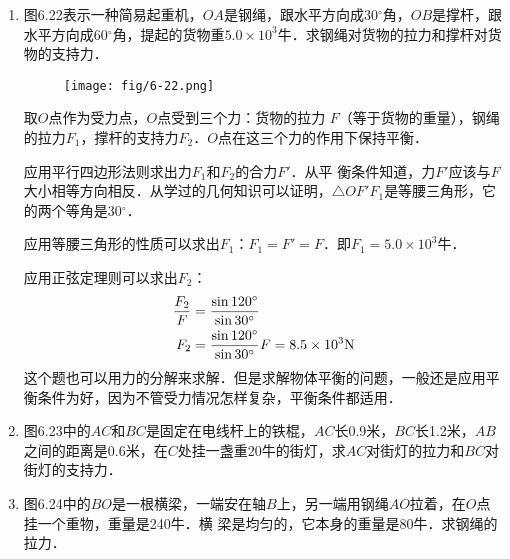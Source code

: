 \begin{enumerate}
    \item 图6.22表示一种简易起重机，$OA$是钢绳，跟水平方向成30$^\circ$角，$OB$是撑杆，跟水平方向成60$^\circ$角，提起的货物重$5.0\times 10^3$牛．求钢绳对货物的拉力和撑杆对货物的支持力．
\begin{figure}[htp]
\centering\texttt{[image: fig/6-22.png]}
\caption{}
\end{figure}

\begin{solution}
取$O$点作为受力点，$O$点受到三个力：货物的拉力
$F$（等于货物的重量），钢绳的拉力$F_1$，撑杆的支持力$F_2$．$O$点在这三个力的作用下保持平衡．

应用平行四边形法则求出力$F_1$和$F_2$的合力$F'$．从平
衡条件知道，力$F'$应该与$F$大小相等方向相反．从学过的几何知识可以证明，$\triangle OF'F_1$是等腰三角形，它的两个等角是30$^\circ$．

应用等腰三角形的性质可以求出$F_1$：$F_1=F'=F$．即$F_1=5.0\times 10^3$牛．

应用正弦定理则可以求出$F_2$：
\[\begin{split}
\frac{F_2}{F}&=\frac{\sin 120^{\circ}}{\sin 30^{\circ}}\\
F_2&=\frac{\sin 120^{\circ}}{\sin 30^{\circ}}F=8.5\times 10^3 {\rm N}
\end{split}\]
这个题也可以用力的分解来求解．但是求解物体平衡的问题，一般还是应用平衡条件为好，因为不管受力情况怎样复杂，平衡条件都适用．
\end{solution}

\item 图6.23中的$AC$和$BC$是固定在电线杆上的铁棍，$AC$长0.9米，$BC$长1.2米，$AB$之间的距离是0.6米，在$C$处挂一盏重20牛的街灯，求$AC$对街灯的拉力和$BC$对街灯的支持力．

\item 图6.24中的$BO$是一根横梁，一端安在轴$B$上，另一端用钢绳$AO$拉着，在$O$点挂一个重物，重量是240牛．横
梁是均匀的，它本身的重量是80牛．求钢绳的拉力．

\begin{figure}[htp]
\centering
\begin{minipage}[t]{0.48\textwidth}
\centering
{}
\end{minipage}
\end{figure}
\end{enumerate}
